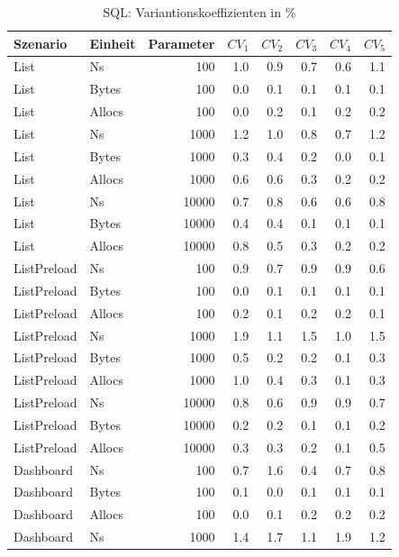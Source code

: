 
\begin{table}[ht]
\setlength{\extrarowheight}{-1pt}
\centering
\caption{SQL: Variantionskoeffizienten in \%}
\begin{tabular}{llrrrrrr}
\toprule
Szenario & Einheit & Parameter & ${CV_1}$ & ${CV_2}$ & ${CV_3}$& ${CV_4}$ & ${CV_5}$ \\
\midrule
	List & Ns & 100 &  1.0 &  0.9 &  0.7 &  0.6 &  1.1 \\
	List & Bytes & 100 &  0.0 &  0.1 &  0.1 &  0.1 &  0.1 \\
	List & Allocs & 100 &  0.0 &  0.2 &  0.1 &  0.2 &  0.2 \\
	List & Ns & 1000 &  1.2 &  1.0 &  0.8 &  0.7 &  1.2 \\
	List & Bytes & 1000 &  0.3 &  0.4 &  0.2 &  0.0 &  0.1 \\
	List & Allocs & 1000 &  0.6 &  0.6 &  0.3 &  0.2 &  0.2 \\
	List & Ns & 10000 &  0.7 &  0.8 &  0.6 &  0.6 &  0.8 \\
	List & Bytes & 10000 &  0.4 &  0.4 &  0.1 &  0.1 &  0.1 \\
	List & Allocs & 10000 &  0.8 &  0.5 &  0.3 &  0.2 &  0.2 \\
	ListPreload & Ns & 100 &  0.9 &  0.7 &  0.9 &  0.9 &  0.6 \\
	ListPreload & Bytes & 100 &  0.0 &  0.1 &  0.1 &  0.1 &  0.1 \\
	ListPreload & Allocs & 100 &  0.2 &  0.1 &  0.2 &  0.2 &  0.1 \\
	ListPreload & Ns & 1000 &  1.9 &  1.1 &  1.5 &  1.0 &  1.5 \\
	ListPreload & Bytes & 1000 &  0.5 &  0.2 &  0.2 &  0.1 &  0.3 \\
	ListPreload & Allocs & 1000 &  1.0 &  0.4 &  0.3 &  0.1 &  0.3 \\
	ListPreload & Ns & 10000 &  0.8 &  0.6 &  0.9 &  0.9 &  0.7 \\
	ListPreload & Bytes & 10000 &  0.2 &  0.2 &  0.1 &  0.1 &  0.2 \\
	ListPreload & Allocs & 10000 &  0.3 &  0.3 &  0.2 &  0.1 &  0.5 \\
	Dashboard & Ns & 100 &  0.7 &  1.6 &  0.4 &  0.7 &  0.8 \\
	Dashboard & Bytes & 100 &  0.1 &  0.0 &  0.1 &  0.1 &  0.1 \\
	Dashboard & Allocs & 100 &  0.0 &  0.1 &  0.2 &  0.2 &  0.2 \\
	Dashboard & Ns & 1000 &  1.4 &  1.7 &  1.1 &  1.9 &  1.2 \\

\end{tabular}
\end{table}
